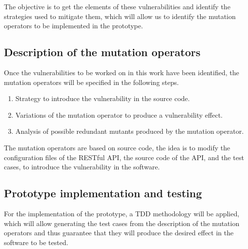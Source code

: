The objective is to get the elements of these vulnerabilities and identify the strategies used to mitigate them, which will allow us to identify the mutation operators to be implemented in the prototype.

\subsection{Description of the mutation operators}

Once the vulnerabilities to be worked on in this work have been identified, the mutation operators will be specified in the following steps.

\begin{enumerate}
    \item Strategy to introduce the vulnerability in the source code.
    \item Variations of the mutation operator to produce a vulnerability effect.
    \item Analysis of possible redundant mutants produced by the mutation operator.
\end{enumerate}

The mutation operators are based on source code, the idea is to modify the configuration files of the RESTful API, the source code of the API, and the test cases, to introduce the vulnerability in the software. 

\subsection{Prototype implementation and testing}

For the implementation of the prototype, a TDD methodology\cite{williams2003test} will be applied, which will allow generating the test cases from the description of the mutation operators and thus guarantee that they will produce the desired effect in the software to be tested.

